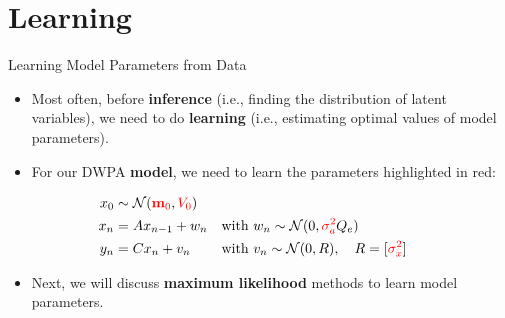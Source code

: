 \section{Learning}

\begin{frame}{Learning Model Parameters from Data}
    \begin{itemize}
        \item Most often, before \textbf{inference} (i.e., finding the distribution of latent variables), we need to do \textbf{learning} (i.e., estimating optimal values of model parameters).
        \item For our DWPA \textbf{model}, we need to learn the parameters highlighted in red:
    \end{itemize}

    \vspace{0.2em}
    \begin{align*}
        x_0 &\sim \mathcal{N}(\textcolor{red}{\mathbf{m}_0}, \textcolor{red}{V_0})\\
        x_n &= A x_{n-1} + w_n && \text{with } w_n \sim \mathcal{N}(0, \textcolor{red}{\sigma_a^2} Q_e) \\
        y_n &= C x_n + v_n && \text{with } v_n \sim \mathcal{N}(0, R), \quad R = [\textcolor{red}{\sigma_x^2}]
    \end{align*}
    \vspace{0.2em}

    \begin{itemize}
        \item Next, we will discuss \textbf{maximum likelihood} methods to learn model parameters.
    \end{itemize}
\end{frame}

